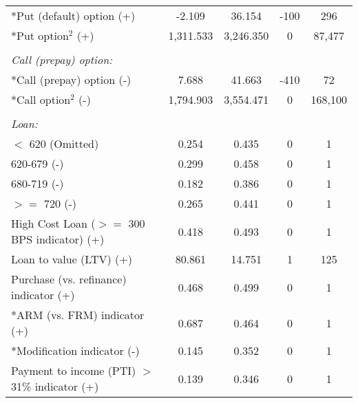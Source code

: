 \begin{tabular}{l*{1}{cccc}}
\hspace{5 mm}*Put (default) option (+)&      -2.109&      36.154&        -100&         296\\
\hspace{5 mm}*Put option$^2$ (+)&   1,311.533&   3,246.350&           0&      87,477\\
& & & & \\ 
 \emph{Call (prepay) option:} & & & \\ 
\hspace{5 mm}*Call (prepay) option (-)&       7.688&      41.663&        -410&          72\\
\hspace{5 mm}*Call option$^2$ (-)&   1,794.903&   3,554.471&           0&     168,100\\
& & & & \\ 
 \emph{Loan:} & & & \\ 
\hspace{5 mm}$<$ 620 (Omitted)&       0.254&       0.435&           0&           1\\
\hspace{5 mm}620-679 (-)&       0.299&       0.458&           0&           1\\
\hspace{5 mm}680-719 (-)&       0.182&       0.386&           0&           1\\
\hspace{5 mm}$>=$ 720 (-)&       0.265&       0.441&           0&           1\\
\hspace{5 mm}High Cost Loan ($>=$ 300 BPS indicator) (+)&       0.418&       0.493&           0&           1\\
\hspace{5 mm}Loan to value (LTV) (+)&      80.861&      14.751&           1&         125\\
\hspace{5 mm}Purchase (vs. refinance) indicator (+)&       0.468&       0.499&           0&           1\\
\hspace{5 mm}*ARM (vs. FRM) indicator (+)&       0.687&       0.464&           0&           1\\
\hspace{5 mm}*Modification indicator (-)&       0.145&       0.352&           0&           1\\
\hspace{5 mm}Payment to income (PTI) $>$ 31\% indicator (+)&       0.139&       0.346&           0&           1\\

\end{tabular}
